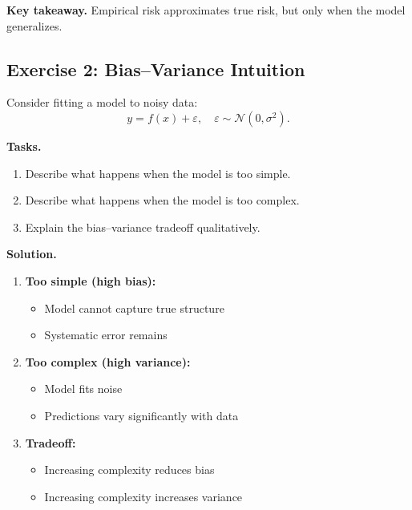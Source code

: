 \medskip

\noindent
\textbf{Key takeaway.}  
Empirical risk approximates true risk, but only when the model generalizes.

\subsection{Exercise 2: Bias--Variance Intuition}

Consider fitting a model to noisy data:
\[
y = f(x) + \varepsilon, \quad \varepsilon \sim \mathcal{N}(0, \sigma^2).
\]

\medskip

\noindent
\textbf{Tasks.}
\begin{enumerate}
    \item Describe what happens when the model is too simple.
    \item Describe what happens when the model is too complex.
    \item Explain the bias--variance tradeoff qualitatively.
\end{enumerate}

\medskip

\noindent
\textbf{Solution.}

\begin{enumerate}
    \item \textbf{Too simple (high bias):}
    \begin{itemize}
        \item Model cannot capture true structure
        \item Systematic error remains
    \end{itemize}

    \item \textbf{Too complex (high variance):}
    \begin{itemize}
        \item Model fits noise
        \item Predictions vary significantly with data
    \end{itemize}

    \item \textbf{Tradeoff:}
    \begin{itemize}
        \item Increasing complexity reduces bias
        \item Increasing complexity increases variance
    \end{itemize}
\end{enumerate}

